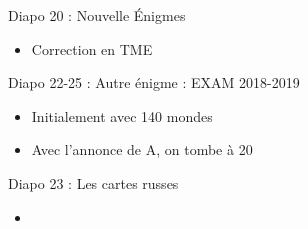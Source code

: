 \documentclass{article}
\theoremstyle{plain}%
\theoremstyle{definition}
\theoremstyle{remark}
\begin{document}
Diapo 20 : Nouvelle Énigmes
\begin{itemize}
    \item Correction en TME
\end{itemize}

Diapo 22-25 : Autre énigme : EXAM 2018-2019
\begin{itemize}
    \item Initialement avec 140 mondes 
    \item Avec l'annonce de A, on tombe à 20 
\end{itemize}

Diapo 23 : Les cartes russes 
\begin{itemize}
    \item 
\end{itemize}
\end{document}
